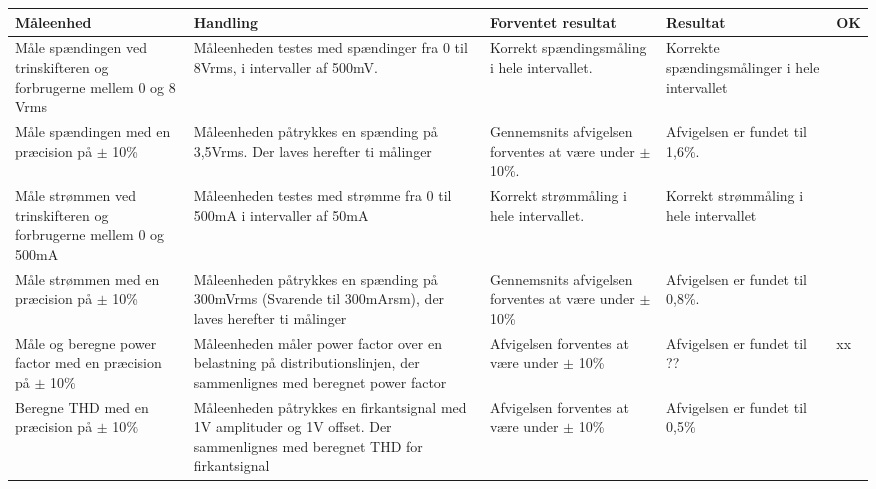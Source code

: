 	\begin{longtable}{|p{4cm}|p{3cm}|p{3cm}|p{3cm}|p{1cm}|}
		\hline
		\textbf{Måleenhed} & \textbf{Handling} & \textbf{Forventet resultat} & \textbf{Resultat} &\textbf{OK} \\\hline
		Måle spændingen ved trinskifteren og forbrugerne mellem 0 og 8 Vrms & Måleenheden testes med spændinger fra 0 til 8Vrms, i intervaller af 500mV. & Korrekt spændingsmåling i hele intervallet. & Korrekte spændingsmålinger i hele intervallet & \checkmark\\\hline
		Måle spændingen med en præcision på $\pm$ 10\%& Måleenheden påtrykkes en spænding på 3,5Vrms. Der laves herefter ti målinger& Gennemsnits afvigelsen forventes at være under $\pm$10\%.& Afvigelsen er fundet til 1,6\%. &\checkmark\\\hline
		Måle strømmen ved trinskifteren og forbrugerne mellem 0 og 500mA& Måleenheden testes med strømme fra 0 til 500mA i intervaller af 50mA&Korrekt strømmåling i hele intervallet.&Korrekt strømmåling i hele intervallet&\checkmark\\\hline
		Måle strømmen med en præcision på $\pm$ 10\%&Måleenheden påtrykkes en spænding på 300mVrms (Svarende til 300mArsm), der laves herefter ti målinger&Gennemsnits afvigelsen forventes at være under $\pm$10\%&Afvigelsen er fundet til 0,8\%.&\checkmark\\\hline
		Måle og beregne power factor med en præcision på $\pm$ 10$\%$&Måleenheden måler power factor over en belastning på distributionslinjen, der sammenlignes med beregnet power factor&Afvigelsen forventes at være under $\pm$ 10\% &Afvigelsen er fundet til ??&xx\\\hline
		Beregne THD med en præcision på $\pm$ 10$\%$&Måleenheden påtrykkes en firkantsignal med 1V amplituder og 1V offset. Der sammenlignes med beregnet THD for firkantsignal& Afvigelsen forventes at være under $\pm$ 10\%&Afvigelsen er fundet til 0,5\%&\checkmark\\\hline
			
	\end{longtable}
	
	
